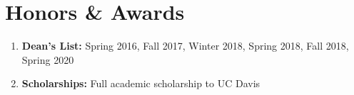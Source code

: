 \section{Honors \& Awards}
\vspace{-1mm}
\begin{enumerate}[leftmargin = 0pt, topsep = 0pt, itemsep = 0.000pt, noitemsep ]

\item[] \textbf{Dean's List:} Spring 2016, Fall 2017, Winter 2018, Spring 2018, Fall 2018, Spring 2020

\item[] \textbf{Scholarships:} Full academic scholarship to UC Davis


\end{enumerate}